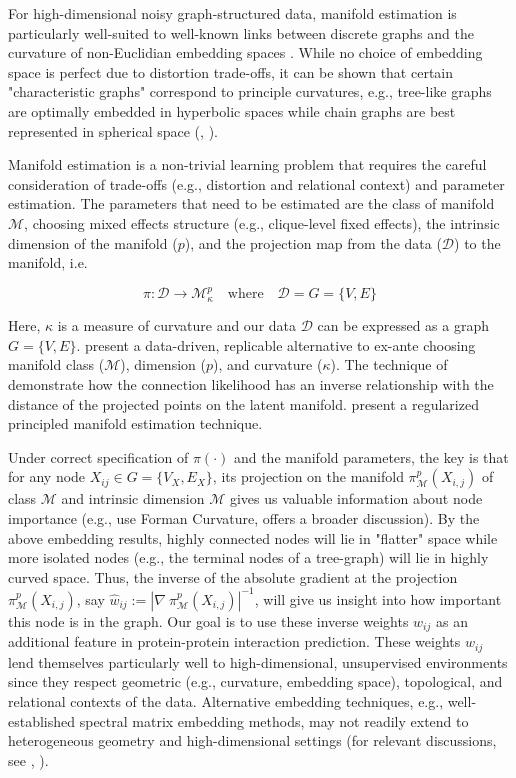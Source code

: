 \documentclass[twoside,11pt]{article}
\begin{document}
For high-dimensional noisy graph-structured data, manifold estimation is particularly well-suited to well-known links between discrete graphs and the curvature of non-Euclidian embedding spaces \citep{bronstein_etal_2017}. While no choice of embedding space is perfect due to distortion trade-offs, it can be shown that certain "characteristic graphs" correspond to principle curvatures, e.g., tree-like graphs are optimally embedded in hyperbolic spaces while chain graphs are best represented in spherical space (\citet{weber_2018}, \citet{weber_2020}). 

Manifold estimation is a non-trivial learning problem that requires the careful consideration of trade-offs (e.g., distortion and relational context) and parameter estimation. The parameters that need to be estimated are the class of manifold $\mathcal{M}$, choosing mixed effects structure (e.g., clique-level fixed effects), the intrinsic dimension of the manifold ($p$), and the projection map from the data ($\mathcal{D}$) to the manifold, i.e. 

\[\pi: \mathcal{D} \rightarrow \mathcal{M}_\kappa^p \quad \text{where} \quad \mathcal{D} = G = \{V,E\}\]

Here, $\kappa$ is a measure of curvature and our data $\mathcal{D}$ can be expressed as a graph $G = \{V,E\}$. \citet{lubold_etal_2022} present a data-driven, replicable alternative to ex-ante choosing manifold class ($\mathcal{M}$), dimension ($p$), and curvature ($\kappa$). The technique of \citet{lubold_etal_2022} demonstrate how the connection likelihood has an inverse relationship with the distance of the projected points on the latent manifold. \citet{meng_eloyan_2021} present a regularized principled manifold estimation technique. 

Under correct specification of $\pi(\cdot)$ and the manifold parameters, the key is that for any node $X_{ij} \in G = \{V_X, E_X\}$, its projection on the manifold $\pi_\mathcal{M}^p(X_{i,j})$ of class $\mathcal{M}$ and intrinsic dimension $\mathcal{M}$ gives us valuable information about node importance (e.g., \citet{yamada_2025} use Forman Curvature, \citet{xu_2020} offers a broader discussion). By the above embedding results, highly connected nodes will lie in "flatter" space while more isolated nodes (e.g., the terminal nodes of a tree-graph) will lie in highly curved space. Thus, the inverse of the absolute gradient at the projection $\pi_\mathcal{M}^p(X_{i,j})$, say $\hat{w}_{ij} := |\nabla~\pi_\mathcal{M}^p(X_{i,j})|^{-1}$, will give us insight into how important this node is in the graph. Our goal is to use these inverse weights $w_{ij}$ as an additional feature in protein-protein interaction prediction. These weights $w_{ij}$ lend themselves particularly well to high-dimensional, unsupervised environments since they respect geometric (e.g., curvature, embedding space), topological, and relational contexts of the data. Alternative embedding techniques, e.g., well-established spectral matrix embedding methods, may not readily extend to heterogeneous geometry and high-dimensional settings (for relevant discussions, see \citet{baptista_etal_2023}, \citet{rubin-delanchy_2021}). 
\end{document}
